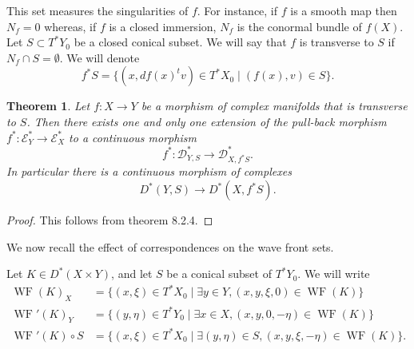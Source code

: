 \documentclass[10pt,twoside]{article}
\numberwithin{equation}{section}
\theoremstyle{plain}
\newtheorem{theorem}[equation]{Theorem}
\theoremstyle{definition}
\DeclareMathOperator{\WF}{WF}
\begin{document}
This set measures the singularities of $f$. For instance, if $f$ is a
smooth map then $N_{f}=0$ whereas, if $f$ is a closed immersion,
$N_{f}$ is the conormal bundle of $f(X)$. Let $S\subset T^{\ast}Y_{0}$ be a
closed conical subset. We will say that $f$ is transverse to $S$ if
$N_{f}\cap S=\emptyset$. We will denote
\begin{displaymath}
  f^{\ast}S=\{(x,df(x)^{t}v)\in T^{\ast}X_{0}\mid (f(x),v)\in
  S\}. 
\end{displaymath}

\begin{theorem}\label{thm:1}
Let $f\colon X\longrightarrow Y$ be a morphism of complex manifolds
that is transverse to $S$. Then
there exists one and only one extension of the pull-back morphism
$f^{\ast}\colon\mathscr{E}^{\ast}_{Y}\longrightarrow
\mathscr{E}^{\ast}_{X}$ to a continuous morphism
\begin{displaymath}
  f^{\ast}\colon\mathscr{D}^{\ast}_{Y,S}\longrightarrow
  \mathscr{D}^{\ast}_{X,f^{\ast}S}. 
\end{displaymath}
In particular there is a continuous morphism of complexes
\begin{displaymath}
  D^{\ast}(Y,S)\longrightarrow D^{\ast}(X,f^{\ast}S).
\end{displaymath}
\end{theorem}
\begin{proof}
  This follows from \cite{Hormander:MR1065993} theorem 8.2.4.  
\end{proof}


We now recall the effect of correspondences on the wave front sets.

Let $K\in D^{\ast}(X\times Y)$, and let $S$ be a conical subset of
$T^{\ast}Y_{0}$.  We will write
\begin{align*}
  \WF(K)_{X}&=\{(x,\xi)\in T^{\ast}X_{0}\mid \exists y\in Y,
  (x,y,\xi,0)\in \WF(K)\}\\
  \WF'(K)_{Y}&=\{(y,\eta)\in T^{\ast}Y_{0}\mid \exists x\in X,
  (x,y,0,-\eta)\in \WF(K)\}\\
  \WF'(K)\circ S&=\{(x,\xi)\in T^{\ast}X_{0}\mid \exists (y,\eta)\in S,
  (x,y,\xi,-\eta)\in \WF(K)\}.
\end{align*}
\end{document}
